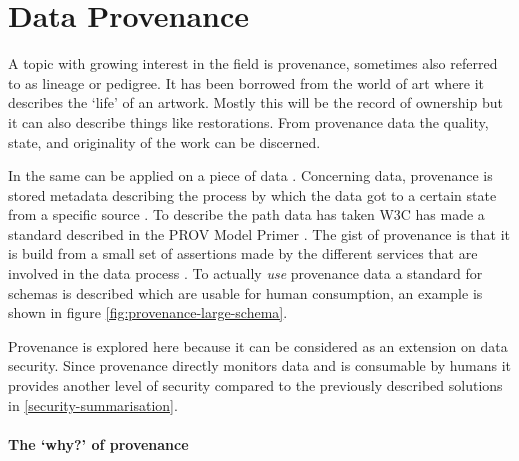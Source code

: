\newcommand{\agent}{{\tt agent}}
\newcommand{\entity}{{\tt entity}}
\newcommand{\activity}{{\tt activity}}
\newcommand{\relation}{{\tt relation}}
\newcommand{\relations}{{\tt relations}}
\newcommand{\attributes}{{\tt attributes}}
\clearpage
\section{Data Provenance}
\label{datamodel-provenance}

A topic with growing interest in the \escience{} field is provenance, sometimes also referred to as lineage or pedigree.
It has been borrowed from the world of art where it describes the `life' of an artwork.
Mostly this will be the record of ownership but it can also describe things like restorations.
From provenance data the quality, state, and originality of the work can be discerned.

In \escience{} the same can be applied on a piece of data \cite{dsp4moreau}.
Concerning data, provenance is stored metadata describing the process by which the data got to a certain state from a specific source \cite{dsp4moreau,dsp2buneman}.
To describe the path data has taken W3C has made a standard described in the PROV Model Primer \cite{dsp8gil}.
The gist of provenance is that it is build from a small set of assertions made by the different services that are involved in  the data process \cite{dsp4moreau}.
To actually \emph{use} provenance data a standard for schemas is described which are usable for human consumption, an example is shown in figure \ref{fig:provenance-large-schema}.

Provenance is explored here because it can be considered as an extension on data security.
Since provenance directly monitors data and is consumable by humans it provides another level of security compared to the previously described solutions in \ref{security-summarisation}.


\paragraph{The `why?' of provenance}
\label{provenance-why}

